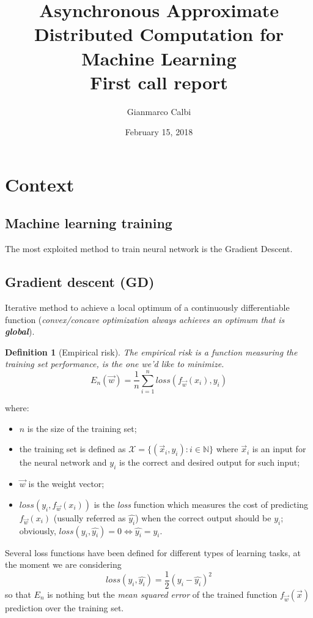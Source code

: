 \documentclass[a4paper,12pt]{article}
\title{%
  Asynchronous Approximate Distributed Computation for Machine Learning  \\
  First call report}
\author{Gianmarco Calbi}
\date{February 15, 2018}
\theoremstyle{newplanestyle}
\theoremstyle{newdefinitionstyle}
\newtheorem{newdef}[newtheo]{Definition}
\theoremstyle{newprovestyle}
\begin{document}
\maketitle

\begin{abstract}

\end{abstract}

\clearpage

\section*{Context}
\subsection*{Machine learning training}
The most exploited method to train neural network is the Gradient Descent.

\subsection*{Gradient descent (GD)}
Iterative method to achieve a local optimum of a continuously differentiable function (\textit{convex/concave optimization always achieves an optimum that is \textbf{global}}).

\begin{newdef}[Empirical risk]
The \textit{empirical risk} is a function measuring the training set performance, is the one we'd like to minimize.
\[
E_n(\vec{w})=\frac{1}{n}\sum_{i=1}^{n}loss(f_{\vec{w}}(x_i),y_i)
\]
\end{newdef}
where:
\begin{itemize}
\item $n$ is the size of the training set;
\item the training set is defined as $\mathcal{X} = \{(\vec{x}_i, y_i) : i \in \mathbb{N}\}$ where $\vec{x}_i$ is an input for the neural network and $y_i$ is the correct and desired output for such input;
\item $\vec{w}$ is the weight vector;
\item $loss(y_i, f_{\vec{w}}(x_i))$ is the \textit{loss} function which measures the cost of predicting $f_{\vec{w}}(x_i)$ (usually referred as $\hat{y_i}$) when the correct output should be $y_i$; obviously, $loss(y_i, \hat{y_i})=0 \Leftrightarrow \hat{y_i} = y_i$.
\end{itemize}

Several loss functions have been defined for different types of learning tasks, at the moment we are considering
\[
loss(y_i, \hat{y_i}) = \frac{1}{2}(y_i - \hat{y_i})^2
\]
so that $E_n$ is nothing but the \textit{mean squared error} of the trained function $f_{\vec{w}}(\vec{x})$ prediction over the training set.
\end{document}
